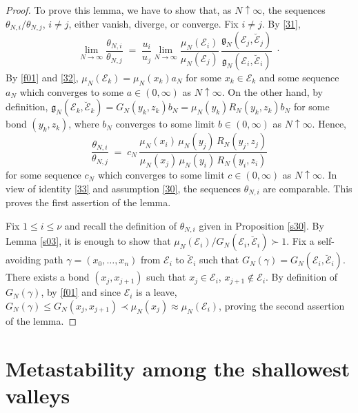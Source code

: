 \documentclass[reqno]{amsart}
\begin{document}
\begin{proof}
To prove this lemma, we have to show that, as $N\uparrow\infty$, the
sequences $\theta_{N,i}/\theta_{N,j}$, $i\not = j$, either vanish,
diverge, or converge. Fix $i\not = j$. By \eqref{31},
\begin{equation*}
\lim_{N\to\infty} \frac{\theta_{N,i}}{\theta_{N,j}} \;=\; 
\frac{u_i}{u_j} \lim_{N\to\infty} 
\frac {\mu_N({{\mathcal E}}_i)}{\mu_N({{\mathcal E}}_j)} \,
\frac {{{\mathfrak g}}_N({{\mathcal E}}_j, \breve{{{\mathcal E}}}_j)}
{{{\mathfrak g}}_N({{\mathcal E}}_i, \breve{{{\mathcal E}}}_i)}\;\cdot
\end{equation*}
By \eqref{f01} and \eqref{32}, $\mu_N({{\mathcal E}}_k) = \mu_N(x_k) a_N$ for
some $x_k\in {{\mathcal E}}_k$ and some sequence $a_N$ which converges to some
$a\in (0,\infty)$ as $N\uparrow\infty$. On the other hand, by
definition, ${{\mathfrak g}}_N({{\mathcal E}}_k, \breve{{{\mathcal E}}}_k) = G_N(y_k,z_k) b_N =
\mu_N(y_k) R_N(y_k,z_k)b_N$ for some bond $(y_k,z_k)$, where $b_N$
converges to some limit $b\in (0,\infty)$ as $N\uparrow\infty$. Hence,
\begin{equation*}
\frac{\theta_{N,i}}{\theta_{N,j}}\;=\;
c_N \, \frac{\mu_N(x_i) \, \mu_N(y_j) \, R_N(y_j,z_j) }
{\mu_N(x_j) \,\mu_N(y_i) \,R_N(y_i,z_i)}
\end{equation*}
for some sequence $c_N$ which converges to some limit $c\in
(0,\infty)$ as $N\uparrow\infty$. In view of identity \eqref{33} and
assumption \eqref{30}, the sequences $\theta_{N,i}$ are
comparable. This proves the first assertion of the lemma.

Fix $1\le i\le \nu$ and recall the definition of $\theta_{N,i}$ given
in Proposition \ref{s30}. By Lemma \ref{s03}, it is enough to show
that $\mu_N({{\mathcal E}}_i)/G_N({{\mathcal E}}_i, \breve{{{\mathcal E}}}_i)\succ 1$. Fix a
self-avoiding path $\gamma =(x_0, \dots, x_n)$ from ${{\mathcal E}}_i$ to
$\breve{{{\mathcal E}}}_i$ such that $G_N(\gamma) = G_N({{\mathcal E}}_i, \breve{{{\mathcal E}}}_i)$. There exists a bond $(x_j,x_{j+1})$ such that $x_j\in{{\mathcal E}}_i$, $x_{j+1}\not\in{{\mathcal E}}_i$. By definition of $G_N(\gamma)$, by
\eqref{f01} and since ${{\mathcal E}}_i$ is a leave, $G_N(\gamma)\le
G_N(x_j,x_{j+1}) \prec \mu_N(x_j) \approx \mu_N({{\mathcal E}}_i)$, proving the
second assertion of the lemma.
\end{proof}

\section{Metastability among the shallowest valleys}
\label{ssec2}
\end{document}
